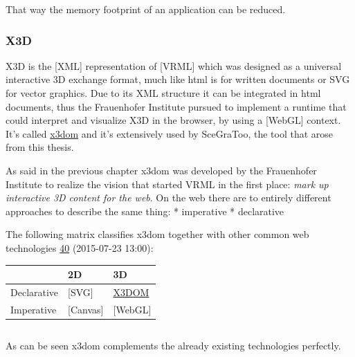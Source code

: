 That way the memory footprint of an application can be reduced.

\subsubsection{X3D}\label{x3d}

X3D is the {[}XML{]} representation of {[}VRML{]} which was designed as
a universal interactive 3D exchange format, much like html is for
written documents or SVG for vector graphics. Due to its XML structure
it can be integrated in html documents, thus the Frauenhofer Institute
pursued to implement a runtime that could interpret and visualize X3D in
the browser, by using a {[}WebGL{]} context. It's called
\href{http://www.x3dom.org/}{x3dom} and it's extensively used by
SceGraToo, the tool that arose from this thesis.


As said in the previous chapter x3dom was developed by the Frauenhofer
Institute to realize the vision that started VRML in the first place:
\emph{mark up interactive 3D content for the web}. On the web there are
to entirely different approaches to describe the same thing: *
imperative * declarative

The following matrix classifies x3dom together with other common web
technologies \href{http://www.x3dom.org}{40} (2015-07-23 13:00):

\begin{longtable}[c]{@{}lll@{}}
\toprule
& 2D & 3D\tabularnewline
\midrule
\endhead
Declarative & {[}SVG{]} & \hyperref[x3dom]{X3DOM}\tabularnewline
Imperative & {[}Canvas{]} & {[}WebGL{]}\tabularnewline
\bottomrule
\end{longtable}

\begin{table}[htbp]
  \centering
  \begin{tabularx}{\textwidth}{X X}
    \hline

  \end{tabularx}
\end{table}

As can be seen x3dom complements the already existing technologies
perfectly.



